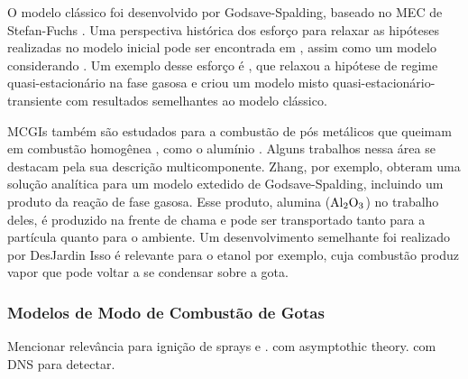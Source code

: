 O modelo clássico foi desenvolvido por Godsave-Spalding, baseado no MEC de Stefan-Fuchs \cite{Glassman2008,Law2006,Turns2000}.
Uma perspectiva histórica dos esforço para relaxar as hipóteses realizadas no modelo inicial pode ser encontrada em \cite{FachiniF1999}, assim como um modelo considerando .
Um exemplo desse esforço é , que relaxou a hipótese de regime quasi-estacionário na fase gasosa e criou um modelo misto quasi-estacionário-transiente com resultados semelhantes ao modelo clássico.

MCGIs também são estudados para a combustão de pós metálicos que queimam em combustão homogênea \source{}, como o alumínio \cite{HenningsJ2024MT}.
Alguns trabalhos nessa área se destacam pela sua descrição multicomponente. 
Zhang\etal \cite{Zhang2022_Coflow,Zhang2022_Counterflow}, por exemplo, obteram uma solução analítica para um modelo extedido de Godsave-Spalding, incluindo um produto da reação de fase gasosa.
Esse produto, alumina ($\mathrm{Al}_2 \mathrm{O}_3$) no trabalho deles, é produzido na frente de chama e pode ser transportado tanto para a partícula quanto para o ambiente.
Um desenvolvimento semelhante foi realizado por DesJardin\etal \cite{DesJardin2005}
Isso é relevante para o etanol por exemplo, cuja combustão produz vapor que pode voltar a se condensar sobre a gota.



 



\subsubsection{Modelos de Modo de Combustão de Gotas}

Mencionar relevância para ignição de sprays e \cite{AggarwalS2014}.
 com asymptothic theory.
 com DNS para detectar.